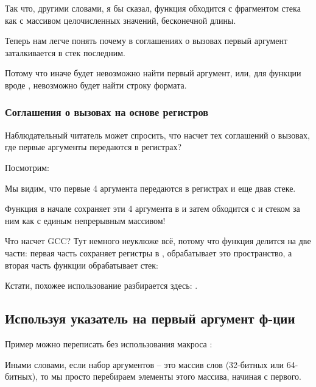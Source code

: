 Так что, другими словами, я бы сказал, функция обходится с фрагментом стека как с массивом целочисленных
значений, бесконечной длины.

Теперь нам легче понять почему в соглашениях о вызовах  первый аргумент 
заталкивается в стек последним.

Потому что иначе будет невозможно найти первый аргумент, или, для функции вроде \printf, невозможно
будет найти строку формата.

\subsubsection{Соглашения о вызовах на основе регистров}
\label{variadic_arith_registers}

Наблюдательный читатель может спросить, что насчет тех соглашений о вызовах, где первые аргументы передаются
в регистрах?

Посмотрим:



Мы видим, что первые 4 аргумента передаются в регистрах и еще два\EMDASH{}в стеке.

Функция  в начале сохраняет эти 4 аргумента в  и затем обходится
с  и стеком за ним как с единым непрерывным массивом!

Что насчет GCC? Тут немного неуклюже всё, потому что функция делится на две части: первая часть
сохраняет регистры в , обрабатывает это пространство, а вторая часть функции обрабатывает стек:



Кстати, похожее использование  разбирается здесь: .

\subsection{Используя указатель на первый аргумент ф-ции}

Пример можно переписать без использования макроса :



Иными словами, если набор аргументов -- это массив слов (32-битных или 64-битных), то мы просто перебираем элементы
этого массива, начиная с первого.

